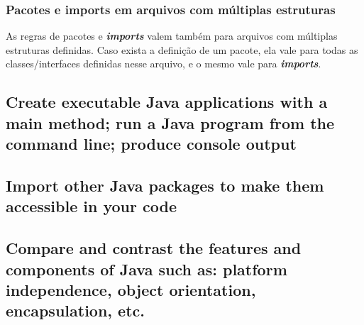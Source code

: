 \documentclass[12pt]{article}
\begin{document}
\subsubsection{Pacotes e imports em arquivos com múltiplas estruturas}

As regras de pacotes e \textbf{\textit{imports}} valem também para arquivos com múltiplas estruturas definidas. Caso exista a definição de um pacote, ela vale para todas as classes/interfaces definidas nesse arquivo, e o mesmo vale para \textbf{\textit{imports}}.

\subsection*{Create executable Java applications with a main method; run a Java program from the command line; produce console output}





\newpage

\subsection*{Import other Java packages to make them accessible in your code}
\subsection*{Compare and contrast the features and components of Java such as: platform independence, object orientation, encapsulation, etc.}

	
\end{document}
